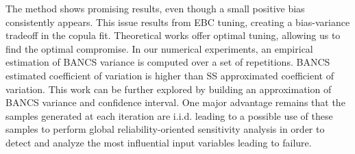 The method shows promising results, even though a small positive bias consistently appears. 
This issue results from EBC tuning, creating a bias-variance tradeoff in the copula fit. 
Theoretical works offer optimal tuning, allowing us to find the optimal compromise. 
In our numerical experiments, an empirical estimation of BANCS variance is computed over a set of repetitions. 
BANCS estimated coefficient of variation is higher than SS approximated coefficient of variation. 
This work can be further explored by building an approximation of BANCS variance and confidence interval. 
One major advantage remains that the samples generated at each iteration are i.i.d. leading to a possible use of these samples to perform global reliability-oriented sensitivity analysis \citep{marrel_chabridon_2021} in order to detect and analyze the most influential input variables leading to failure.